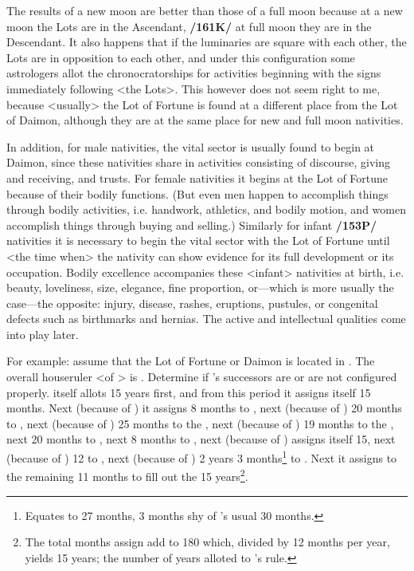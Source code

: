 The results of a new moon are better than those of a full
moon because at a new moon the Lots are in the Ascendant, \textbf{/161K/} at full moon they are in the Descendant. It also happens that if the luminaries are square with each other, the Lots are in opposition to each other, and under this configuration some astrologers allot the chronocratorships for activities beginning with the signs immediately following <the Lots>. This however does not seem right to me, because
<usually> the Lot of Fortune is found at a different place from the Lot of Daimon, although they are at the same place for new and full moon nativities.

In addition, for male nativities, the vital sector is usually found to begin at Daimon, since these nativities share in activities consisting of discourse, giving and receiving, and trusts. For female nativities it begins at the Lot of Fortune because of their bodily functions. (But even men happen to accomplish things through bodily activities, i.e. handwork, athletics, and bodily motion, and women accomplish
things through buying and selling.) Similarly for infant \textbf{/153P/} nativities it is necessary to begin the vital
sector with the Lot of Fortune until <the time when> the nativity can show evidence for its full development or its occupation. Bodily excellence accompanies these <infant> nativities at birth, i.e. beauty, loveliness, size, elegance, fine proportion, or—which is more usually the case—the opposite: injury, disease, rashes, eruptions, pustules, or congenital defects such as birthmarks and hernias. The
active and intellectual qualities come into play later.

For example: assume that the Lot of Fortune or Daimon is located in \Aries. The overall houseruler <of \Aries> is \Mars. Determine if \Mars’s successors are or are not configured properly. \Mars\xspace itself allots 15 years first, and from this period it assigns itself 15 months. Next (because of \Taurus) it assigns 8 months to \Venus, next (because of \Gemini) 20 months to \Mercury, next (because of \Cancer) 25 months to the \Moon, next (because of \Leo) 19 months to the \Sun, next 20 months to \Mercury, next 8 months to \Venus,
next (because of \Scorpio) \Mars assigns itself 15, next (because of \Sagittarius) 12 to \Jupiter, next (because of
\Capricorn) 2 years 3 months\footnote{Equates to 27 months, 3 months shy of \Saturn's usual 30 months.} to \Saturn. Next it assigns to \Aquarius\, the remaining 11 months to fill out the 15 years\footnote{The total months assign add to 180 which, divided by 12 months per year, yields 15 years; the number of years alloted to \Mars's rule.}. 

